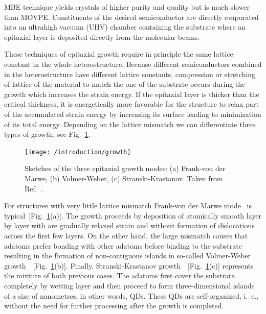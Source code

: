 \documentclass[
a4paper, %
11pt, %
onecolumn, %
openany, %
oldfontcommands,
]{memoir}
\begin{document}
MBE technique yields crystals of higher purity and quality but is much slower than MOVPE. Constituents of the desired semiconductor are directly evaporated into an ultrahigh vacuum (UHV) chamber containing the substrate where an epitaxial layer is deposited directly from the molecular beams.

These techniques of epitaxial growth require in principle the same lattice constant in the whole heterostructure. Because different semiconductors combined in the heterostructure have different lattice constants, compression or stretching of lattice of the material to match the one of the substrate occurs during the growth which increases the strain energy. %
% 
If the epitaxial layer is thicker than the critical thickness, it is energetically more favorable for the structure to relax part of the accumulated strain energy by increasing its surface leading to minimization of its total energy.
Depending on the lattice mismatch %
we can differentiate three types of growth, see Fig.~\ref{fig:intr:growth}.
%
\begin{figure}
	\centering
	\texttt{[image: /introduction/growth]}
	\caption{Sketches of the three epitaxial growth modes: (a) Frank-von der Marwe, (b) Volmer-Weber, (c) Stranski-Krastanov. Taken from Ref.~\cite{t_bonato}.}
	\label{fig:intr:growth}
\end{figure}
%

For structures with very little lattice mismatch Frank-von der Marwe mode~\cite{Frank-Merwe} is typical~[Fig.~\ref{fig:intr:growth}(a)]. The growth proceeds by deposition of atomically smooth layer by layer with are gradually relaxed strain and without formation of dislocations across the first few layers. On the other hand, the large mismatch causes that adatoms prefer bonding with other adatoms before binding to the substrate resulting in the formation of non-contiguous islands in so-called Volmer-Weber growth~\cite{Volmer-Weber}~[Fig.~\ref{fig:intr:growth}(b)]. Finally, Stranski-Krastanov growth~\cite{Stranski1937}~[Fig.~\ref{fig:intr:growth}(c)] represents the mixture of both previous cases. The adatoms first cover the substrate completely by wetting layer and then proceed to form three-dimensional islands of a size of nanometres, in other words, QDs. These QDs are self-organized, i.~e., without the need for further processing after the growth is completed.
\end{document}
